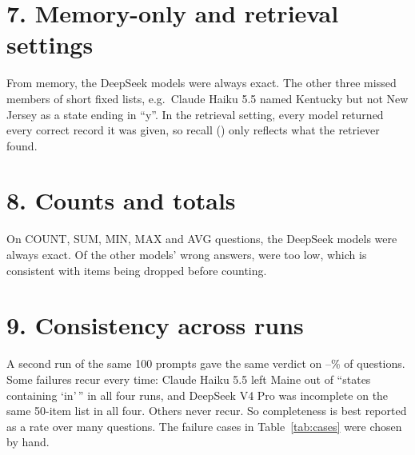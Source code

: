 \documentclass[10pt]{article}
\begin{document}
\begin{table}[!htbp]
\centering\small
\resizebox{\linewidth}{!}{}
\caption{Exact-set accuracy (\%) on selection questions by number of WHERE conditions.}
\label{tab:conditions}
\end{table}

\FloatBarrier
\section*{7. Memory-only and retrieval settings}
From memory, the DeepSeek models were always exact. The other three missed members of short fixed lists, e.g.\
Claude Haiku 5.5 named Kentucky but not New Jersey as a state ending in ``y''. In the retrieval setting, every
model returned every correct record it was given, so recall (\ragrecall) only reflects what the retriever found.

\begin{table}[!htbp]
\centering\small
\resizebox{\linewidth}{!}{}
\caption{Memory-only and retrieval questions. ``Recall over retrieved'' counts only correct items the retriever
returned.}
\label{tab:settings}
\end{table}

\FloatBarrier
\section*{8. Counts and totals}
On \nscalar{} COUNT, SUM, MIN, MAX and AVG questions, the DeepSeek models were always exact. Of the other models'
\scalarerrors{} wrong answers, \scalarunder{} were too low, which is consistent with items being dropped before
counting.

\begin{table}[!htbp]
\centering\small

\caption{Single-number aggregation questions.}
\label{tab:scalar}
\end{table}

\FloatBarrier
\section*{9. Consistency across runs}
A second run of the same 100 prompts gave the same verdict on \agreemin--\agreemax\% of questions. Some failures
recur every time: Claude Haiku 5.5 left Maine out of ``states containing `in'\,'' in all four runs, and DeepSeek
V4 Pro was incomplete on the same 50-item list in all four. Others never recur. So completeness is best reported
as a rate over many questions. The failure cases in Table~\ref{tab:cases} were chosen by hand.
\end{document}
